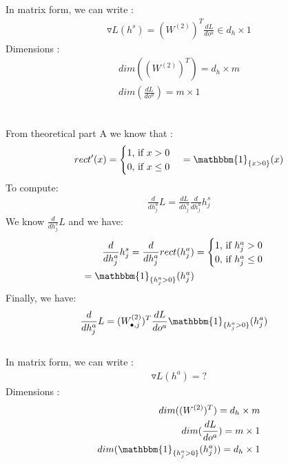 \documentclass[12pt]{article}
\begin{document}
\subsection{}
In matrix form, we can write :
\begin{align*}
\triangledown L(h^s) =(W^{(2)})^T  \frac{dL}{do^a} \in d_h \times 1
\end{align*}
Dimensions :
\begin{align*}
dim((W^{(2)})^T ) = d_h \times m \\
dim(\frac{dL}{do^a}) = m \times 1 \\
\end{align*}
\subsection{}
From theoretical part A we know that :
\begin{align*}
rect'(x) = \begin{cases}
               1$, if $ x > 0 \\
               0$, if $ x \leq 0  \\
            \end{cases} = \mathbbm{1}_{\{x>0\}}(x)
\end{align*}
To compute: 
\begin{align*}
\frac{d}{dh^a_j} L =\frac{dL}{dh_j^s} \frac{d}{dh^a_j} h_j^s
\end{align*}
We know $\frac{d}{dh^s_j} L$ and we have:
\begin{align*}
\frac{d}{dh^a_j} {h^s_j} = \frac{d}{dh^a_j} {rect(h^a_j)} &=  \begin{cases}
               1$, if $ h^a_j > 0 \\
               0$, if $ h^a_j \leq 0  \\
            \end{cases}  \\ = \mathbbm{1}_{\{h^a_j>0\}}(h^a_j)
\end{align*}
Finally, we have:
\begin{align*}
\frac{d}{dh^a_j} L & = (W^{(2)}_{\bullet,j})^T \frac{dL}{do^a}  \mathbbm{1}_{\{h^a_j>0\}}(h^a_j)
\end{align*}
\subsection{}
In matrix form, we can write :
\begin{align*}
\triangledown L(h^a) = ?
\end{align*}
Dimensions :
\begin{align*}
dim((W^{(2)})^T ) = d_h \times m \\
dim(\frac{dL}{do^a}) = m \times 1 \\
dim(\mathbbm{1}_{\{h^a_j>0\}}(h^a_j)) = d_h \times 1 \\
\end{align*}
\end{document}
